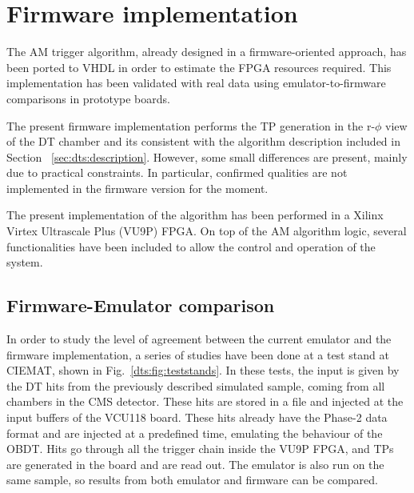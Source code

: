\documentclass[../main.tex]{subfiles}
\begin{document}
\section{Firmware implementation}
\label{hh:sec:fw}

The AM trigger algorithm, already designed in a firmware-oriented approach, has been ported to VHDL in order to estimate the FPGA resources required. This implementation has been validated with real data using emulator-to-firmware comparisons in prototype boards.

The present firmware implementation performs the TP generation in the r-$\phi$ view of the DT chamber and its consistent with the algorithm description included in Section~ \ref{sec:dts:description}. However, some small differences are present, mainly due to practical constraints. In particular, confirmed qualities are not implemented in the firmware version for the moment. 

The present implementation of the algorithm has been performed in a Xilinx Virtex Ultrascale Plus (VU9P) FPGA. On top of the AM algorithm logic, several functionalities have been included to allow the control and operation of the system.

\subsection{Firmware-Emulator comparison}

In order to study the level of agreement between the current emulator and the firmware implementation, a series of studies have been done at a test stand at CIEMAT, shown in Fig.~\ref{dts:fig:teststands}. In these tests, the input is given by the DT hits from the previously described simulated sample, coming from all chambers in the CMS detector. These hits are stored in a file and injected at the input buffers of the VCU118 board. These hits already have the Phase-2 data format and are injected at a predefined time, emulating the behaviour of the OBDT. Hits go through all the trigger chain inside the VU9P FPGA, and TPs are generated in the board and are read out. The emulator is also run on the same sample, so results from both emulator and firmware can be compared.
\end{document}
